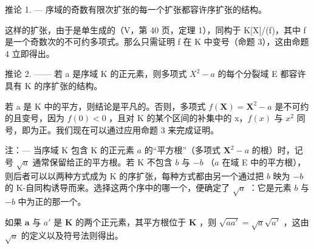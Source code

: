 推论 1. --- 序域的奇数有限次扩张的每一个扩张都容许序扩张的结构。

这样的扩张，由于是单生成的（V，第 40 页，定理 1），同构于 K{[}X{]}/(f)，其中 f 是一个奇数次的不可约多项式。那么只需证明 f 在 K 中变号（命题 3），这由命题 4 立即得出。

推论 2. —— 若 a 是序域 K 的正元素，则多项式 \(X^{2}-a\) 的每个分裂域 E 都容许具有 K 的序扩张的结构。

若 a 是 K 中的平方，则结论是平凡的。否则，多项式 \(f(\mathbf{X}) = \mathbf{X}^{2} - a\) 是不可约的且变号，因为 \(f(0) < 0\) ，且对 K 的某个区间的补集中的 x，\(f(x)\) 与 \(x^{2}\) 同号，即为正。我们现在可以通过应用命题 3 来完成证明。

注：--- 当序域 K 包含 K 的正元素 \(a\) 的“平方根”（多项式 \(\mathbf{X}^2 - a\) 的根）时，记号 \(\sqrt{a}\) 通常保留给正的平方根。若 K 不包含 \(b\) 与 \(-b\) （\(a\) 在域 E 中的平方根），则后者可以以两种方式成为 K 的序扩张，每种方式都由另一个通过把 \(b\) 映为 \(-b\) 的 K-自同构诱导而来。选择这两个序中的哪一个，便确定了 \(\sqrt{a}\) ：它是元素 \(b\) 与 \(-b\) 中为正的那一个。

如果 \(\pmb{a}\) 与 \(a'\) 是 \(\mathbf{K}\) 的两个正元素，其平方根位于 \(\mathbf{K}\) ，则 \(\sqrt{aa'} = \sqrt{a}\sqrt{a'}\) ，这由 \(\sqrt{a}\) 的定义以及符号法则得出。

